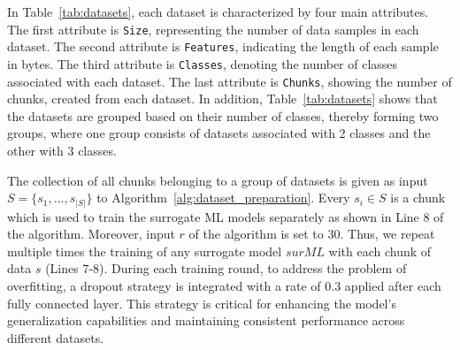 \documentclass[letterpaper]{article}
\begin{document}
In Table~\ref{tab:datasets}, each dataset is characterized by four main attributes. The first attribute is \texttt{Size}, representing the number of data samples in each dataset. The second attribute is \texttt{Features}, indicating the length of each sample in bytes. The third attribute is \texttt{Classes}, denoting the number of classes associated with each dataset. The last attribute is \texttt{Chunks}, showing the number of chunks, created from each dataset. In addition, Table~\ref{tab:datasets} shows that the datasets are grouped based on their number of classes, thereby forming two groups, where one group consists of datasets associated with 2 classes and the other with 3 classes. 


\begin{table}[!t]
\centering
\caption{Summary of the datasets utilized in the training of the surrogate ML models in \textsc{Phase 1}.}

\label{tab:datasets}
\end{table}

The collection of all chunks belonging to a group of datasets is given as input $S = \{s_1, ..., s_{|S|}\}$ to Algorithm~\ref{alg:dataset_preparation}. Every $s_i \in S$ is a chunk which is used to train the surrogate ML models separately as shown in Line 8 of the algorithm. Moreover, input $r$ of the algorithm is set to 30. Thus, we repeat multiple times the training of any surrogate model $surML$ with each chunk of data $s$ (Lines 7-8). During each training round, to address the problem of overfitting, a dropout strategy is integrated with a rate of 0.3 applied after each fully connected layer. This strategy is critical for enhancing the model’s generalization capabilities and maintaining consistent performance across different datasets. 
\end{document}
